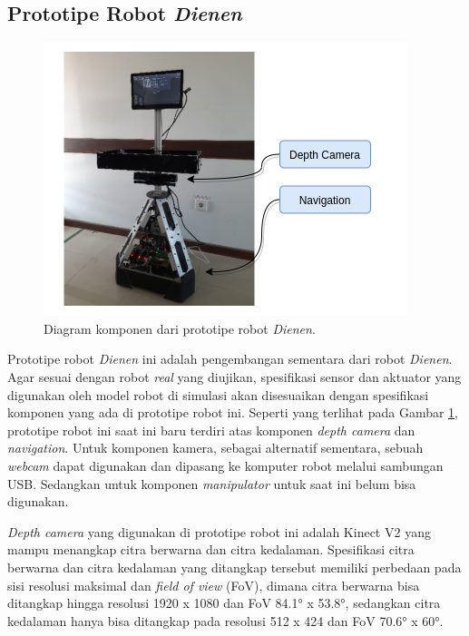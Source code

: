 \subsection{Prototipe Robot \emph{Dienen}}
\label{subsec:prototiperobotdienen}

\begin{figure} [ht]
  \centering
  \includegraphics[scale=0.5]{gambar/komponen-prototipe-robot.png}
  \caption{Diagram komponen dari prototipe robot \emph{Dienen}.}
  \label{fig:komponenprototiperobot}
\end{figure}

Prototipe robot \emph{Dienen} ini adalah pengembangan sementara dari robot \emph{Dienen}.
Agar sesuai dengan robot \emph{real} yang diujikan,
  spesifikasi sensor dan aktuator yang digunakan oleh model robot di simulasi akan disesuaikan dengan spesifikasi komponen yang ada di prototipe robot ini.
Seperti yang terlihat pada Gambar \ref{fig:komponenprototiperobot},
  prototipe robot ini saat ini baru terdiri atas komponen \emph{depth camera} dan \emph{navigation}.
Untuk komponen kamera, sebagai alternatif sementara, sebuah \emph{webcam} dapat digunakan dan dipasang ke komputer robot melalui sambungan USB.
Sedangkan untuk komponen \emph{manipulator} untuk saat ini belum bisa digunakan.

\emph{Depth camera} yang digunakan di prototipe robot ini adalah Kinect V2 yang mampu menangkap citra berwarna dan citra kedalaman.
Spesifikasi citra berwarna dan citra kedalaman yang ditangkap tersebut memiliki perbedaan pada sisi resolusi maksimal dan \emph{field of view} (FoV),
  dimana citra berwarna bisa ditangkap hingga resolusi 1920 x 1080 dan FoV 84.1° x 53.8°,
  sedangkan citra kedalaman hanya bisa ditangkap pada resolusi 512 x 424 dan FoV 70.6° x 60°.

